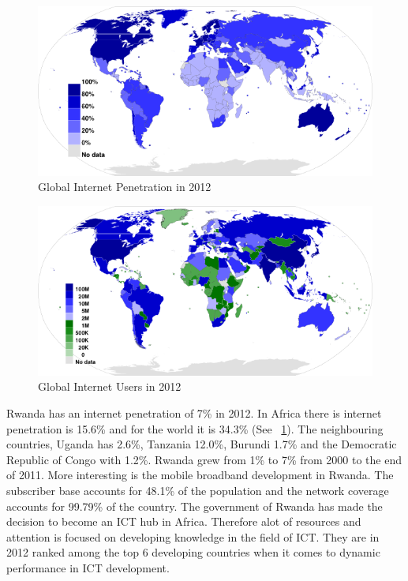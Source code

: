 \begin{figure}
\centering
\includegraphics[width=12cm]{empirical/images/internet_penetration_2012}
\caption{Global Internet Penetration in 2012 \cite{3}}
\label{fig:global_internet_penetration_2012}
\end{figure}
\begin{figure}
\centering
\includegraphics[width=12cm]{empirical/images/internet_users_2012}
\caption{Global Internet Users in 2012 \cite{3}}
\label{fig:global_internet_users_2012}
\end{figure}
Rwanda has an internet penetration of 7\% in 2012. In Africa there is internet penetration is 15.6\% and for the world it is 34.3\% (See ~\ref{fig:global_internet_penetration_2012}).
The neighbouring countries, Uganda has 2.6\%, Tanzania 12.0\%, Burundi 1.7\% and the Democratic Republic of Congo with 1.2\%\cite{4}. Rwanda grew from 1\% to 7\% from 2000 to the end of 2011\cite{2}.
More interesting is the mobile broadband development in Rwanda. The subscriber base accounts for 48.1\% of the population and the network coverage accounts for 99.79\% of the country.
The government of Rwanda has made the decision to become an ICT hub in Africa. Therefore alot of resources and attention is focused on developing knowledge in the field of ICT. 
They are in 2012 ranked among the top 6 developing countries when it comes to dynamic performance in ICT development\cite{5}.
